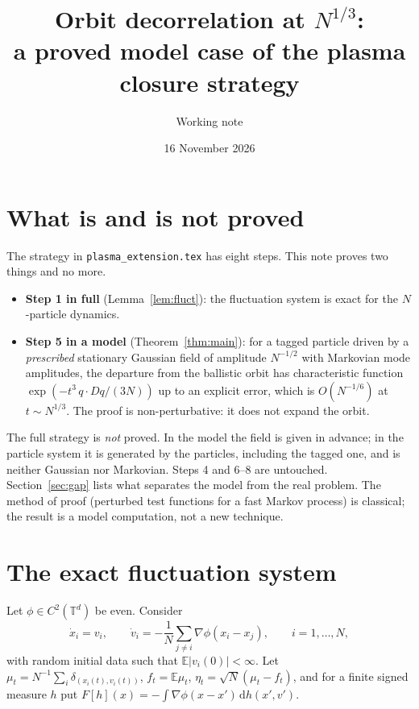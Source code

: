 \documentclass[11pt]{article}
\title{Orbit decorrelation at $N^{1/3}$:\\
a proved model case of the plasma closure strategy}
\author{Working note}
\date{16 November 2026}
\newcommand{\dd}{\mathrm{d}}
\newcommand{\E}{\mathbb{E}}
\theoremstyle{remark}
\begin{document}
\maketitle

\section{What is and is not proved}

The strategy in \texttt{plasma\_extension.tex} has eight steps. This note
proves two things and no more.
\begin{itemize}
  \item \textbf{Step 1 in full} (Lemma~\ref{lem:fluct}): the fluctuation
    system is exact for the $N$-particle dynamics.
  \item \textbf{Step 5 in a model} (Theorem~\ref{thm:main}): for a tagged
    particle driven by a \emph{prescribed} stationary Gaussian field of
    amplitude $N^{-1/2}$ with Markovian mode amplitudes, the departure from
    the ballistic orbit has characteristic function
    $\exp(-t^3\,q\cdot Dq/(3N))$ up to an explicit error, which is
    $O(N^{-1/6})$ at $t\sim N^{1/3}$. The proof is non-perturbative: it does
    not expand the orbit.
\end{itemize}
The full strategy is \emph{not} proved. In the model the field is given in
advance; in the particle system it is generated by the particles, including
the tagged one, and is neither Gaussian nor Markovian. Steps 4 and 6--8 are
untouched. Section~\ref{sec:gap} lists what separates the model from the real
problem. The method of proof (perturbed test functions for a fast Markov
process) is classical; the result is a model computation, not a new
technique.

\section{The exact fluctuation system}

Let $\phi\in C^2(\mathbb{T}^d)$ be even. Consider
\begin{equation}
  \dot x_i = v_i, \qquad
  \dot v_i = -\frac1N\sum_{j\ne i}\nabla\phi(x_i - x_j),
  \qquad i = 1,\dots,N,
  \label{eq:nbody}
\end{equation}
with random initial data such that $\E|v_i(0)| < \infty$. Let
$\mu_t = N^{-1}\sum_i\delta_{(x_i(t),v_i(t))}$, $f_t = \E\mu_t$,
$\eta_t = \sqrt N(\mu_t - f_t)$, and for a finite signed measure $h$ put
$F[h](x) = -\int\nabla\phi(x - x')\,\dd h(x',v')$.
\end{document}

